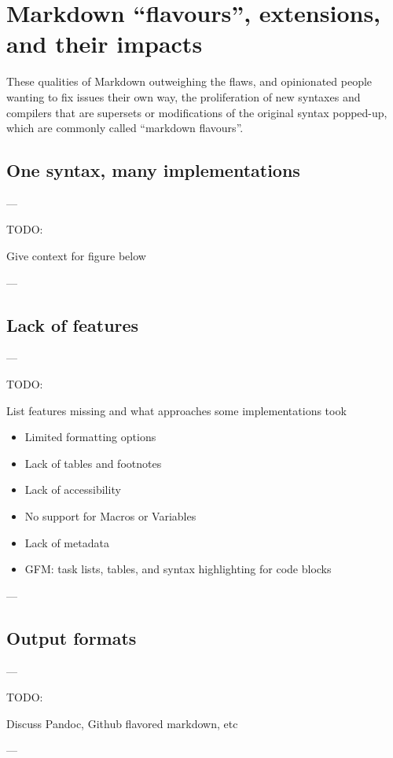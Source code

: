 \chapter{Markdown ``flavours'', extensions, and their impacts}

\vspace{1cm}


These qualities of Markdown outweighing the flaws, and opinionated people wanting to fix issues their own way, the proliferation of new syntaxes
and compilers that are supersets or modifications of the original syntax popped-up, which are commonly called ``markdown flavours''.

\section{One syntax, many implementations}

---

TODO:

Give context for figure below

---



\section{Lack of features}

---

TODO:

List features missing and what approaches some implementations took

\begin{itemize}
    \item Limited formatting options
    \item Lack of tables and footnotes
    \item Lack of accessibility
    \item No support for Macros or Variables
    \item Lack of metadata
    \item GFM: task lists, tables, and syntax highlighting for code blocks
\end{itemize}

---

\section{Output formats}

---

TODO:

Discuss Pandoc, Github flavored markdown, etc

---


\cite{voegler2014markdown}